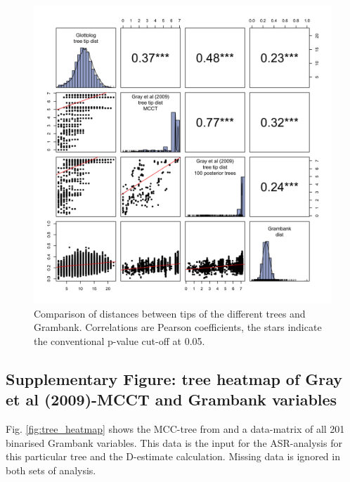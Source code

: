 \documentclass[12pt,letterpaper]{article}
\begin{document}
\begin{figure}[!ht]
\centering
\includegraphics[width=17cm]{illustrations/plots_from_R/SPLOM_tree_dists.png}
\caption{Comparison of distances between tips of the different trees and Grambank. Correlations are Pearson coefficients, the stars indicate the conventional p-value cut-off at 0.05.}
\label{tree_dist_splom}
\end{figure}

\FloatBarrier
\newpage
\subsection{Supplementary Figure: tree heatmap of Gray et al (2009)-MCCT and Grambank variables}
\label{supp:fig_tree_heatmap}

Fig. \ref{fig:tree_heatmap} shows the MCC-tree from \citet{grayetal_2009} and a data-matrix of all 201 binarised Grambank variables. This data is the input for the ASR-analysis for this particular tree and the D-estimate calculation. Missing data is ignored in both sets of analysis.
\end{document}
